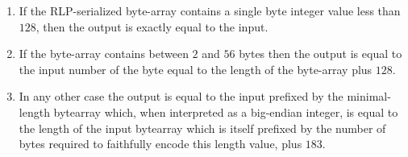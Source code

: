 \documentclass[10pt,a4paper,oneside]{scrartcl}
\begin{document}
\begin{enumerate}
	\item If the RLP-serialized byte-array contains a single byte integer value less than $128$, then the output is exactly equal to the input. 
	\item If the byte-array contains between $2$ and $56$ bytes then the output is equal to the input number of the byte equal to the length of the byte-array plus $128$.  
	\item In any other case the output is equal to the input prefixed by the minimal-length bytearray which, when interpreted as a big-endian integer, is equal to the length of the input bytearray which is itself prefixed by the number of bytes required to faithfully encode this length value, plus $183$.
\end{enumerate}


\printbibliography
\end{document}
